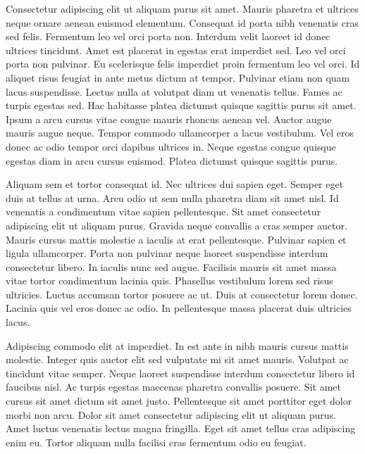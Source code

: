 \documentclass[11pt,a4paper]{article}
\begin{document}
Consectetur adipiscing elit ut aliquam purus sit amet. Mauris pharetra et ultrices neque ornare aenean euismod elementum. Consequat id porta nibh venenatis cras sed felis. Fermentum leo vel orci porta non. Interdum velit laoreet id donec ultrices tincidunt. Amet est placerat in egestas erat imperdiet sed. Leo vel orci porta non pulvinar. Eu scelerisque felis imperdiet proin fermentum leo vel orci. Id aliquet risus feugiat in ante metus dictum at tempor. Pulvinar etiam non quam lacus suspendisse. Lectus nulla at volutpat diam ut venenatis tellus. Fames ac turpis egestas sed. Hac habitasse platea dictumst quisque sagittis purus sit amet. Ipsum a arcu cursus vitae congue mauris rhoncus aenean vel. Auctor augue mauris augue neque. Tempor commodo ullamcorper a lacus vestibulum. Vel eros donec ac odio tempor orci dapibus ultrices in. Neque egestas congue quisque egestas diam in arcu cursus euismod. Platea dictumst quisque sagittis purus.

Aliquam sem et tortor consequat id. Nec ultrices dui sapien eget. Semper eget duis at tellus at urna. Arcu odio ut sem nulla pharetra diam sit amet nisl. Id venenatis a condimentum vitae sapien pellentesque. Sit amet consectetur adipiscing elit ut aliquam purus. Gravida neque convallis a cras semper auctor. Mauris cursus mattis molestie a iaculis at erat pellentesque. Pulvinar sapien et ligula ullamcorper. Porta non pulvinar neque laoreet suspendisse interdum consectetur libero. In iaculis nunc sed augue. Facilisis mauris sit amet massa vitae tortor condimentum lacinia quis. Phasellus vestibulum lorem sed risus ultricies. Luctus accumsan tortor posuere ac ut. Duis at consectetur lorem donec. Lacinia quis vel eros donec ac odio. In pellentesque massa placerat duis ultricies lacus.

Adipiscing commodo elit at imperdiet. In est ante in nibh mauris cursus mattis molestie. Integer quis auctor elit sed vulputate mi sit amet mauris. Volutpat ac tincidunt vitae semper. Neque laoreet suspendisse interdum consectetur libero id faucibus nisl. Ac turpis egestas maecenas pharetra convallis posuere. Sit amet cursus sit amet dictum sit amet justo. Pellentesque sit amet porttitor eget dolor morbi non arcu. Dolor sit amet consectetur adipiscing elit ut aliquam purus. Amet luctus venenatis lectus magna fringilla. Eget sit amet tellus cras adipiscing enim eu. Tortor aliquam nulla facilisi cras fermentum odio eu feugiat.
\end{document}
